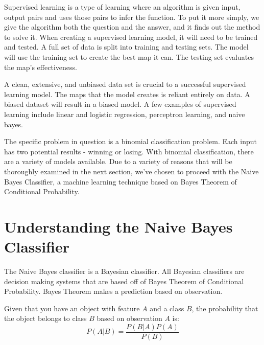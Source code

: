 \documentclass[11pt, twoside, reqno]{article}
\begin{document}
Supervised learning is a type of learning where an algorithm is given input, output pairs and uses those pairs to infer the function. To put it more simply, we give the algorithm both the question and the answer, and it finds out the method to solve it. When creating a supervised learning model, it will need to be trained and tested. A full set of data is split into training and testing sets. The model will use the training set to create the best map it can. The testing set evaluates the map's effectiveness. 

A clean, extensive, and unbiased data set is crucial to a successful supervised learning model. The maps that the model creates is reliant entirely on data. A biased dataset will result in a biased model. A few examples of supervised learning include linear and logistic regression, perceptron learning, and naive bayes. 

The specific problem in question is a binomial classification problem. Each input has two potential results - winning or losing. With binomial classification, there are a variety of models available. Due to a variety of reasons that will be thoroughly examined in the next section, we've chosen to proceed with the Naive Bayes Classifier, a machine learning technique based on Bayes Theorem of Conditional Probability. 

\section{Understanding the Naive Bayes Classifier}
\hspace{0.2in} The Naive Bayes classifier is a Bayesian classifier. All Bayesian classifiers are decision making systems that are based off of Bayes Theorem of Conditional Probability. Bayes Theorem makes a prediction based on observation. 

Given that you have an object with feature $A$ and a class $B$, the probability that the object belongs to class $B$ based on observation $A$ is:
\begin{equation}
\label{eq:bayes}
P(A|B) = \dfrac{P(B|A)P(A)}{P(B)}
\end{equation}
\end{document}
